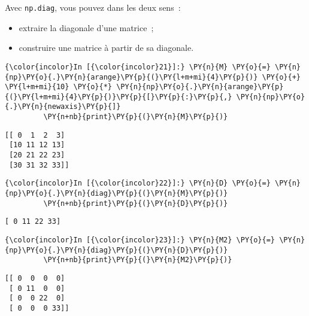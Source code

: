     Avec \texttt{np.diag}, vous pouvez dans les deux sens~:

\begin{itemize}
\item
  extraire la diagonale d'une matrice~;
\item
  construire une matrice à partir de sa diagonale.
\end{itemize}

    \begin{Verbatim}[commandchars=\\\{\}]
{\color{incolor}In [{\color{incolor}21}]:} \PY{n}{M} \PY{o}{=} \PY{n}{np}\PY{o}{.}\PY{n}{arange}\PY{p}{(}\PY{l+m+mi}{4}\PY{p}{)} \PY{o}{+} \PY{l+m+mi}{10} \PY{o}{*} \PY{n}{np}\PY{o}{.}\PY{n}{arange}\PY{p}{(}\PY{l+m+mi}{4}\PY{p}{)}\PY{p}{[}\PY{p}{:}\PY{p}{,} \PY{n}{np}\PY{o}{.}\PY{n}{newaxis}\PY{p}{]}
         \PY{n+nb}{print}\PY{p}{(}\PY{n}{M}\PY{p}{)}
\end{Verbatim}


    \begin{Verbatim}[commandchars=\\\{\}]
[[ 0  1  2  3]
 [10 11 12 13]
 [20 21 22 23]
 [30 31 32 33]]

    \end{Verbatim}

    \begin{Verbatim}[commandchars=\\\{\}]
{\color{incolor}In [{\color{incolor}22}]:} \PY{n}{D} \PY{o}{=} \PY{n}{np}\PY{o}{.}\PY{n}{diag}\PY{p}{(}\PY{n}{M}\PY{p}{)}
         \PY{n+nb}{print}\PY{p}{(}\PY{n}{D}\PY{p}{)}
\end{Verbatim}


    \begin{Verbatim}[commandchars=\\\{\}]
[ 0 11 22 33]

    \end{Verbatim}

    \begin{Verbatim}[commandchars=\\\{\}]
{\color{incolor}In [{\color{incolor}23}]:} \PY{n}{M2} \PY{o}{=} \PY{n}{np}\PY{o}{.}\PY{n}{diag}\PY{p}{(}\PY{n}{D}\PY{p}{)}
         \PY{n+nb}{print}\PY{p}{(}\PY{n}{M2}\PY{p}{)}
\end{Verbatim}


    \begin{Verbatim}[commandchars=\\\{\}]
[[ 0  0  0  0]
 [ 0 11  0  0]
 [ 0  0 22  0]
 [ 0  0  0 33]]

    \end{Verbatim}

